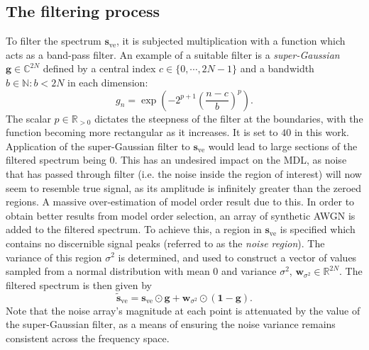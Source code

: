 \subsection{The filtering process}
To filter the spectrum $\symbf{s}_{\text{ve}}$, it is subjected multiplication
with a function which acts as a band-pass filter. An example of a suitable
filter is a \emph{super-Gaussian} $\symbf{g} \in \mathbb{C}^{2N}$ defined by a
central index $c \in \lbrace 0, \cdots, 2N-1 \rbrace$ and a bandwidth  $b \in
\mathbb{N}: b < 2N$ in each dimension:
\begin{equation}
    g_n = \exp \left(-2^{p+1} \left(\frac{n - c}{b}\right)^p\right).
    \label{eq:super-Gaussian-onedim}
\end{equation}
The scalar $p \in \mathbb{R}_{>0}$ dictates the steepness
of the filter at the boundaries, with the function becoming more rectangular
as it increases. It is set to $40$ in this work. Application of the
super-Gaussian filter to $\symbf{s}_{\text{ve}}$
would lead to large sections of the filtered spectrum being $0$. This has an
undesired impact on the \ac{MDL}, as noise that has passed through filter (i.e.
the noise inside the region of interest) will now seem to resemble true signal,
as its amplitude is infinitely greater than the zeroed regions. A massive
over-estimation of model order result due to this. In order to obtain better
results from model order selection, an array of synthetic \ac{AWGN} is
added to the filtered spectrum. To achieve this, a region in
$\symbf{s}_{\text{ve}}$ is specified which contains no discernible signal peaks
(referred to as the \emph{noise region}). The variance of this region
$\sigma^2$ is determined, and used to construct a vector of values sampled from
a normal distribution with mean $0$ and variance $\sigma^2$,
$\symbf{w}_{\sigma^2} \in \mathbb{R}^{2N}$.
The filtered spectrum is then given by
\begin{equation}
    \widetilde{\symbf{s}}_{\text{ve}} = \symbf{s}_{\text{ve}} \odot \symbf{g} + \symbf{w}_{\sigma^2} \odot \left(\symbf{1} - \symbf{g} \right).
    \label{eq:Sve-tilde}
\end{equation}
Note that the noise array's magnitude at each point is attenuated by the value
of the super-Gaussian filter, as a means of ensuring the noise variance remains
consistent across the frequency space.

